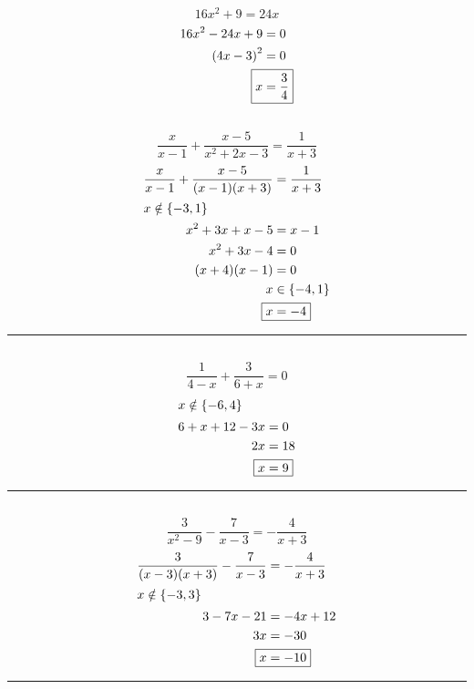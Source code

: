 	\subsection{}
		\[16x^2 + 9 = 24x\]
		\begin{align*}
			16x^2 - 24x + 9 &= 0 \\
			{(4x - 3)}^2 &= 0 \\
			\Aboxed{x &= \frac{3}{4}}
		\end{align*}

	\subsection{}
		\[\frac{x}{x - 1} + \frac{x - 5}{x^2 + 2x - 3} = \frac{1}{x + 3}\]
		\begin{align*}
			\frac{x}{x - 1} + \frac{x - 5}{(x - 1)(x + 3)} &= \frac{1}{x + 3} \\
			\intertext{$x \notin \{-3, 1\}$}
			x^2 + 3x + x - 5 &= x - 1 \\
			x^2 + 3x - 4 &= 0 \\
			(x + 4)(x - 1) &= 0 \\
			x &\in \{-4, 1\} \\
			\Aboxed{x &= -4}
		\end{align*}
		\hrule{}

	\subsection{}
		\[\frac{1}{4 - x} + \frac{3}{6 + x} = 0\]
		\begin{align*}
			\intertext{$x \notin \{-6, 4\}$}
			6 + x + 12 - 3x &= 0 \\
			2x &= 18 \\
			\Aboxed{x &= 9}
		\end{align*}
		\hrule{}

	\subsection{}
		\[\frac{3}{x^2 - 9} - \frac{7}{x - 3} = -\frac{4}{x + 3}\]
		\begin{align*}
			\frac{3}{(x - 3)(x + 3)} - \frac{7}{x - 3} &= -\frac{4}{x + 3} \\
			\intertext{$x \notin \{-3, 3\}$}
			3 - 7x - 21 &= -4x + 12 \\
			3x &= -30 \\
			\Aboxed{x &= -10}
		\end{align*}
		\hrule{}

